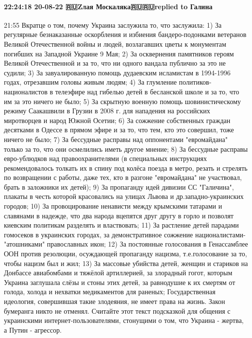 \paragraph{22:24:18 20-08-22 🇷🇺Zлая Москаляка🇷🇺🇷🇺replied to Галина}

21:55
Вкратце о том, почему Украина заслужила то, что заслужила:
1) За регулярные безнаказанные оскорбления и избиения бандеро-подонками ветеранов Великой Отечественной войны и людей, возлагавших цветы к монументам погибших на Западной Украине 9 Мая;
2) За осквернения памятников героям Великой Отечественной и за то, что ни одного вандала публично за это не судили;
3) За завуалированную помощь дудаевским исламистам в 1994-1996 годах, отрезавшим головы живым людям;
4) За глумление политиков-националистов в телеэфире над гибелью детей в бесланской школе и за то, что им за это ничего не было;
5) За скрытную военную помощь шовинистическому режиму Саакашвили в Грузии в 2008 г. для нападения на российских миротворцев и народ Южной Осетии;
6) За сожжение собственных граждан десятками в Одессе в прямом эфире и за то, что тем, кто это совершил, тоже ничего не было;
7) За бессудные расправы над оппонентами "евромайдана" только за то, что они осмелились иметь другое мнение;
8) За бессудные расправы евро-ублюдков над правоохранителями (в специальных инструкциях рекомендовалось толкать их в спину под колёса поезда в метро, резать и стрелять по возвращении с работы, даже тех, кто в разгоне "евромайдана" не участвовал, брать в заложники их детей);
9) За пропаганду идей дивизии СС "Галичина", плакаты в честь которой красовались на улицах Львова и др.западно-украинских городов;
10) За провоцирование ненависти между крымскими татарами и славянами в надежде, что два народа вцепятся друг другу в горло и позволят киевским политикам разделять и властвовать;
11) За растление детей парадами гомосеков в украинских городах, за демонстративное сожжение националистами-"атошниками" православных икон;
12) За постоянные голосования в Генассамблее ООН против резолюции, осуждающей пропаганду нацизма, т.е.голосование за то, чтобы нацизм был и жил;
13) За массовые убийства детей, женщин и стариков на Донбассе авиабомбами и тяжёлой артиллерией, за злорадный гогот, которым Украина заглушала слёзы и стоны этих детей, за равнодушие к их смертям от голода, холода и нехватки медикаментов для раненых;
Государственная идеология, совершившая такие злодеяния, не имеет права на жизнь. Закон бумеранга никто не отменял.
Считайте этот текст подсказкой для общения с украинскими интернет-пользователями, стонущими о том, что Украина - жертва, а Путин - агрессор.

